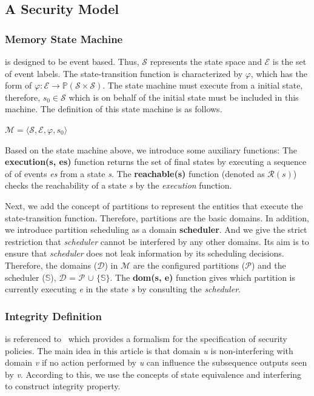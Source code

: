 \documentclass[runningheads]{llncs}
\begin{document}
\subsection{A Security Model}

\subsubsection{Memory State Machine} is designed to be event based. Thus, $\mathcal{S}$ represents the state space and $\mathcal{E}$ is the set of event labels. The state-transition function is characterized by $\varphi$, which has the form of $\varphi: \mathcal{E} \rightarrow \mathbb{P}(\mathcal{S} \times \mathcal{S})$. The state machine must execute from a initial state, therefore, $s_0 \in \mathcal{S}$ which is on behalf of the initial state must be included in this machine. The definition of this state machine is as follows.

\begin{definition}  $\mathcal{M} = \langle \mathcal{S}, \mathcal{E}, \varphi, s_0 \rangle$
\end{definition}

Based on the state machine above, we introduce some auxiliary functions: The \textbf{execution(s, es)} function returns the set of final states by executing a sequence of of events \emph{es} from a state \emph{s}. The \textbf{reachable(s)} function (denoted as $\mathcal{R}(s)$) checks the reachability of a state \emph{s} by the \emph{execution} function.

Next, we add the concept of partitions to represent the entities that execute the state-transition function. Therefore, partitions are the basic domains. In addition, we introduce partition scheduling as a domain \textbf{scheduler}. And we give the strict restriction that \emph{scheduler} cannot be interfered by any other domains. Its aim is to ensure that \emph{scheduler} does not leak information by its scheduling decisions. Therefore, the domains ($\mathcal{D}$) in $\mathcal{M}$ are the configured partitions ($\mathcal{P}$) and the scheduler ($\mathbb{S}$), $\mathcal{D}$ = $\mathcal{P}$ $\cup$ $\lbrace$$\mathbb{S}$$\rbrace$. The \textbf{dom(s, e)} function gives which partition is currently executing \emph{e} in the state \emph{s} by consulting the \emph{scheduler}.

\subsubsection{Integrity Definition} is referenced to~\cite{reg_noninterference} which provides a formalism for the specification of security policies. The main idea in this article is that domain \emph{u} is non-interfering with domain \emph{v} if no action performed by \emph{u} can influence the subsequence outputs seen by \emph{v}. According to this, we use the concepts of state equivalence and interfering to construct integrity property.
\end{document}
